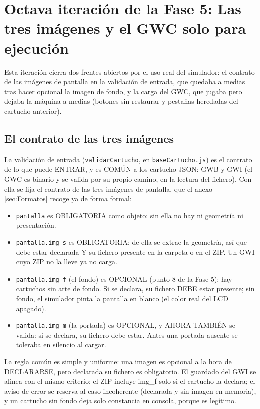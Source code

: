 \section{Octava iteración de la Fase 5: Las tres imágenes y el GWC solo para ejecución}
\label{sec:F5I8}

Esta iteración cierra dos frentes abiertos por el uso real del
simulador: el contrato de las imágenes de pantalla en la validación
de entrada, que quedaba a medias tras hacer opcional la imagen de
fondo, y la carga del GWC, que jugaba pero dejaba la máquina a
medias (botones sin restaurar y pestañas heredadas del cartucho
anterior).

\subsection{El contrato de las tres imágenes}
\label{sec:F5I8Imagenes}

La validación de entrada (\texttt{validarCartucho}, en
\texttt{baseCartucho.js}) es el contrato de lo que puede ENTRAR, y es
COMÚN a los cartucho JSON: GWB y GWI (el GWC es binario y se valida
por su propio camino, en la lectura del fichero). Con ella se fija el
contrato de las tres imágenes de pantalla, que el anexo
\ref{sec:Formatos} recoge ya de forma formal:

\begin{itemize}
	\item \texttt{pantalla} es OBLIGATORIA como objeto: sin ella no
	hay ni geometría ni presentación.
	\item \texttt{pantalla.img\_s} es OBLIGATORIA: de ella se extrae
	la geometría, así que debe estar declarada Y su fichero presente
	en la carpeta o en el ZIP. Un GWI cuyo ZIP no la lleve ya no
	carga.
	\item \texttt{pantalla.img\_f} (el fondo) es OPCIONAL (punto 8 de
	la Fase 5): hay cartuchos sin arte de fondo. Si se declara, su
	fichero DEBE estar presente; sin fondo, el simulador pinta la
	pantalla en blanco (el color real del LCD apagado).
	\item \texttt{pantalla.img\_m} (la portada) es OPCIONAL, y AHORA
	TAMBIÉN se valida: si se declara, su fichero debe estar. Antes una
	portada ausente se toleraba en silencio al cargar.
\end{itemize}

La regla común es simple y uniforme: una imagen es opcional a la
hora de DECLARARSE, pero declarada su fichero es obligatorio. El
guardado del GWI se alinea con el mismo criterio: el ZIP incluye
img\_f solo si el cartucho la declara; el aviso de error se reserva
al caso incoherente (declarada y sin imagen en memoria), y un
cartucho sin fondo deja solo constancia en consola, porque es
legítimo.

